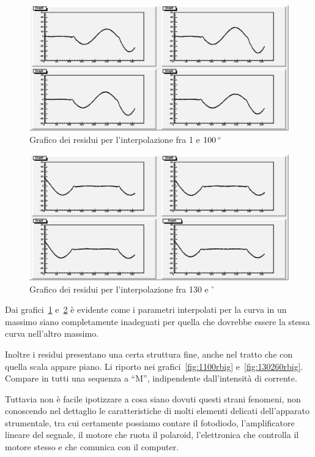 \documentclass[italian,a4paper]{article}
\begin{document}
\begin{figure}[h]
    \begin{center}
        \includegraphics[height=0.4\textheight, width=.9\textwidth]{grafici/1-100r.eps}
    \end{center}
    \caption{Grafico dei residui per l'interpolazione fra 1 e
    $\unit[100]{^\circ}$}
    \label{fig:1100r}
\end{figure}
\begin{figure}[h]
    \begin{center}
        \includegraphics[height=0.4\textheight, width=.9\textwidth]{grafici/130-260r.eps}
    \end{center}
    \caption{Grafico dei residui per l'interpolazione fra 130 e
    \unit[260]{$^\circ$}}
    \label{fig:130260r}
\end{figure}

Dai grafici~\ref{fig:1100r} e~\ref{fig:130260r} \`e evidente come i parametri interpolati per la curva in un massimo siano
completamente inadeguati per quella che dovrebbe essere la stessa curva
nell'altro massimo.

Inoltre i residui presentano una certa struttura fine, anche nel tratto che
con quella scala appare piano. Li riporto nei grafici~\ref{fig:1100rbig}
e~\ref{fig:130260rbig}. Compare in tutti una sequenza a ``M'', indipendente
dall'intensità di corrente.

Tuttavia non è facile ipotizzare a cosa siano dovuti questi strani fenomeni,
non conoscendo nel dettaglio le caratteristiche di molti elementi
delicati dell'apparato strumentale, tra cui certamente possiamo
contare il fotodiodo, l'amplificatore lineare del segnale, il motore che
ruota il polaroid, l'elettronica che controlla il motore stesso e che
comunica con il computer.
\end{document}
